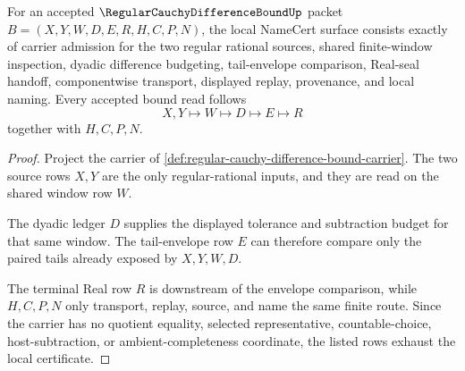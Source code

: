 \begin{theorem}
\label{thm:regular-cauchy-difference-bound-namecert-obligations}
For an accepted $\RegularCauchyDifferenceBoundUp$ packet $B=(X,Y,W,D,E,R,H,C,P,N)$, the local NameCert surface consists exactly of carrier admission for the two regular rational sources, shared finite-window inspection, dyadic difference budgeting, tail-envelope comparison, Real-seal handoff, componentwise transport, displayed replay, provenance, and local naming. Every accepted bound read follows
$$
X,Y\longmapsto W\longmapsto D\longmapsto E\longmapsto R
$$
together with $H,C,P,N$.
\end{theorem}
\begin{proof}
Project the carrier of \autoref{def:regular-cauchy-difference-bound-carrier}. The two source rows $X,Y$ are the only regular-rational inputs, and they are read on the shared window row $W$.

The dyadic ledger $D$ supplies the displayed tolerance and subtraction budget for that same window. The tail-envelope row $E$ can therefore compare only the paired tails already exposed by $X,Y,W,D$.

The terminal Real row $R$ is downstream of the envelope comparison, while $H,C,P,N$ only transport, replay, source, and name the same finite route. Since the carrier has no quotient equality, selected representative, countable-choice, host-subtraction, or ambient-completeness coordinate, the listed rows exhaust the local certificate.
\end{proof}

